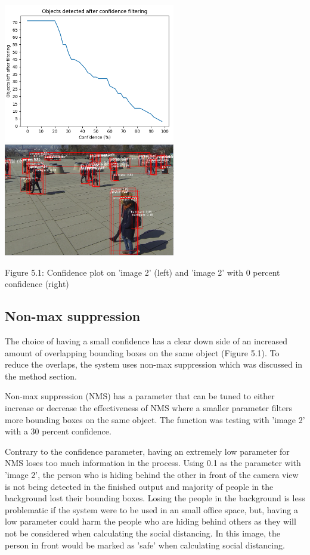 \documentclass[12pt]{report}
\begin{document}
\begin{center}
\includegraphics[width=75mm]{./images/appendix/ConfidencePlot.PNG}
\includegraphics[width=75mm]{./images/zeroConfidence.PNG}

\vspace{3mm}
{\footnotesize Figure 5.1: Confidence plot on 'image 2' (left) and 'image 2' with 0 percent confidence (right)}
\end{center}

\subsection*{Non-max suppression}

The choice of having a small confidence has a clear down side of an increased amount of overlapping bounding boxes on the same object (Figure 5.1). To reduce the overlaps, the system uses non-max suppression which was discussed in the method section.  

\vspace{2mm}

Non-max suppression (NMS) has a parameter that can be tuned to either increase or decrease the effectiveness of NMS where a smaller parameter filters more bounding boxes on the same object. The function was testing with 'image 2' with a 30 percent confidence.

\vspace{2mm}

Contrary to the confidence parameter, having an extremely low parameter for NMS loses too much information in the process. Using 0.1 as the parameter with 'image 2', the person who is hiding behind the other in front of the camera view is not being detected in the finished output and majority of people in the background lost their bounding boxes. Losing the people in the background is less problematic if the system were to be used in an small office space, but, having a low parameter could harm the people who are hiding behind others as they will not be considered when calculating the social distancing. In this image, the person in front would be marked as 'safe' when calculating social distancing.
\end{document}
